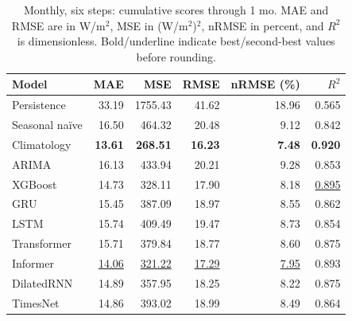 \begin{table}[!htbp]
\centering
\small
\setlength{\tabcolsep}{6pt}
\caption{Monthly, six steps: cumulative scores through 1 mo. MAE and RMSE are in W/m$^2$, MSE in (W/m$^2$)$^2$, nRMSE in percent, and $R^2$ is dimensionless. Bold/underline indicate best/second-best values before rounding.}
\label{tab:baseline_monthly_6_1}
\begin{tabular}{@{}lrrrrr@{}}
\toprule
Model & MAE & MSE & RMSE & nRMSE (\%) & $R^2$ \\
\midrule
Persistence & 33.19 & 1755.43 & 41.62 & 18.96 & 0.565 \\
Seasonal na\"ive & 16.50 & 464.32 & 20.48 & 9.12 & 0.842 \\
Climatology & \textbf{13.61} & \textbf{268.51} & \textbf{16.23} & \textbf{7.48} & \textbf{0.920} \\
ARIMA & 16.13 & 433.94 & 20.21 & 9.28 & 0.853 \\
XGBoost & 14.73 & 328.11 & 17.90 & 8.18 & \underline{0.895} \\
GRU & 15.45 & 387.09 & 18.97 & 8.55 & 0.862 \\
LSTM & 15.74 & 409.49 & 19.47 & 8.73 & 0.854 \\
Transformer & 15.71 & 379.84 & 18.77 & 8.60 & 0.875 \\
Informer & \underline{14.06} & \underline{321.22} & \underline{17.29} & \underline{7.95} & 0.893 \\
DilatedRNN & 14.89 & 357.95 & 18.25 & 8.22 & 0.875 \\
TimesNet & 14.86 & 393.02 & 18.99 & 8.49 & 0.864 \\
\bottomrule
\end{tabular}
\end{table}

